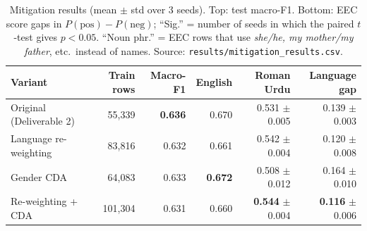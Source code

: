\documentclass[11pt,a4paper]{article}
\begin{document}
\begin{table}[H]
\centering
\footnotesize
\begin{tabular}{lrrrrr}
\toprule
\textbf{Variant} & \textbf{Train rows} & \textbf{Macro-F1} & \textbf{English} & \textbf{Roman Urdu} & \textbf{Language gap} \\
\midrule
Original (Deliverable 2) & 55,339  & \textbf{0.636} & 0.670 & 0.531 $\pm$ 0.005 & 0.139 $\pm$ 0.003 \\
Language re-weighting    & 83,816  & 0.632 & 0.661 & 0.542 $\pm$ 0.004 & 0.120 $\pm$ 0.008 \\
Gender CDA               & 64,083  & 0.633 & \textbf{0.672} & 0.508 $\pm$ 0.012 & 0.164 $\pm$ 0.010 \\
Re-weighting + CDA       & 101,304 & 0.631 & 0.660 & \textbf{0.544} $\pm$ 0.004 & \textbf{0.116} $\pm$ 0.006 \\
\bottomrule
\end{tabular}

\vspace{6pt}
\caption{Mitigation results (mean $\pm$ std over 3 seeds). Top: test macro-F1. Bottom: EEC
score gaps in $P(\text{pos}) - P(\text{neg})$; ``Sig.'' = number of seeds in which the paired
$t$-test gives $p < 0.05$. ``Noun phr.'' = EEC rows that use \emph{she/he, my mother/my father},
etc.\ instead of names. Source: \texttt{results/mitigation\_results.csv}.}
\label{tab:mitigation}
\end{table}
\end{document}
